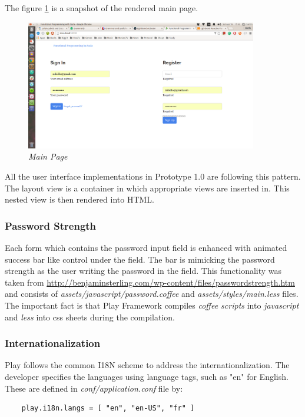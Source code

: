 \documentclass[12pt,twoside,a4paper]{report}
\begin{document}
The figure \ref{f4.3.1.3} is a snapshot of the rendered main page.

\begin{figure}[!ht]
	\centering
		\includegraphics[width=0.9\textwidth, totalheight=8cm]
		{main_page_view}
	\caption{\textit{Main Page}}
	\label{f4.3.1.3}
\end{figure}

All the user interface implementations in Prototype 1.0 are following this pattern. The layout view is a container in which appropriate views are inserted in. This nested view is then rendered into HTML.

\subsubsection{Password Strength}\label{4.3.1.3}
Each form which contains the password input field is enhanced with animated success bar like control under the field. The bar is mimicking the password strength as the user writing the password in the field. This functionality was taken from \url{http://benjaminsterling.com/wp-content/files/passwordstrength.htm} and consists of \emph{assets/javascript/password.coffee} and \emph{assets/styles/main.less} files. The important fact is that Play Framework compiles \emph{coffee scripts} into \emph{javascript} and \emph{less} into css sheets during the compilation.

\subsubsection{Internationalization}\label{4.3.1.4}

Play follows the common I18N scheme to address the internationalization. The developer specifies the languages using language tags, such as "en" for English. These are defined in \emph{conf/application.conf} file by:
\begin{lstlisting}
	play.i18n.langs = [ "en", "en-US", "fr" ]
\end{lstlisting}
\end{document}
